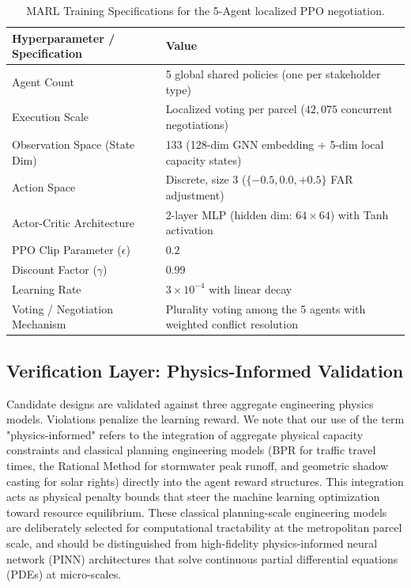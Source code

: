 \documentclass[final,3p,times]{elsarticle}
\begin{document}
\begin{table}[htbp]
\centering
\caption{MARL Training Specifications for the 5-Agent localized PPO negotiation.}
\label{tab:marl_spec}
\begin{tabular}{ll}
\toprule
\textbf{Hyperparameter / Specification} & \textbf{Value} \\
\midrule
Agent Count & 5 global shared policies (one per stakeholder type) \\
Execution Scale & Localized voting per parcel ($42,075$ concurrent negotiations) \\
Observation Space (State Dim) & 133 (128-dim GNN embedding + 5-dim local capacity states) \\
Action Space & Discrete, size 3 ($\{-0.5, 0.0, +0.5\}$ FAR adjustment) \\
Actor-Critic Architecture & 2-layer MLP (hidden dim: $64 \times 64$) with Tanh activation \\
PPO Clip Parameter ($\epsilon$) & $0.2$ \\
Discount Factor ($\gamma$) & $0.99$ \\
Learning Rate & $3 \times 10^{-4}$ with linear decay \\
Voting / Negotiation Mechanism & Plurality voting among the 5 agents with weighted conflict resolution \\
\bottomrule
\end{tabular}
\end{table}

\subsection{Verification Layer: Physics-Informed Validation}
Candidate designs are validated against three aggregate engineering physics models. Violations penalize the learning reward. We note that our use of the term "physics-informed" refers to the integration of aggregate physical capacity constraints and classical planning engineering models (BPR for traffic travel times, the Rational Method for stormwater peak runoff, and geometric shadow casting for solar rights) directly into the agent reward structures. This integration acts as physical penalty bounds that steer the machine learning optimization toward resource equilibrium. These classical planning-scale engineering models are deliberately selected for computational tractability at the metropolitan parcel scale, and should be distinguished from high-fidelity physics-informed neural network (PINN) architectures that solve continuous partial differential equations (PDEs) at micro-scales.
\end{document}
